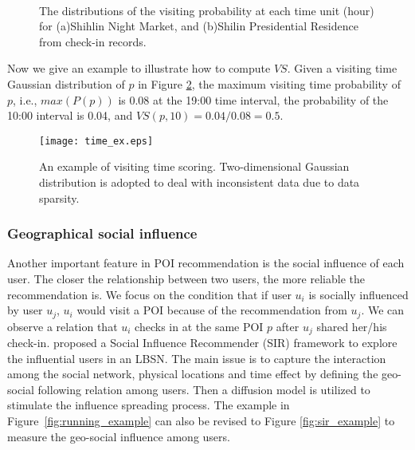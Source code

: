 \begin{figure}[t]
\centerline{
\mbox{
}}
\caption{The distributions of the visiting probability at each time unit (hour) for (a)Shihlin Night Market, and (b)Shilin Presidential Residence from check-in records.}
\label{fig:time_distribute}
\end{figure}

Now we give an example to illustrate how to compute $VS$. Given a visiting time Gaussian distribution of $p$ in Figure \ref{fig:time_ex}, the maximum visiting time probability of $p$, i.e., $max(P(p))$ is 0.08 at the 19:00 time interval, the probability of the 10:00 interval is 0.04, and $VS(p,10)=0.04/0.08=0.5$.

\begin{figure}[t]
\centering
\texttt{[image: time\_ex.eps]}
\caption{An example of visiting time scoring. Two-dimensional Gaussian distribution is adopted to deal with inconsistent data due to data sparsity.}
\label{fig:time_ex} %
\end{figure}

\subsubsection{Geographical social influence}
Another important feature in POI recommendation is the social influence of each user. The closer the relationship between two users, the more reliable the recommendation is. We focus on the condition that if user $u_i$ is socially influenced by user $u_j$, $u_i$ would visit a POI because of the recommendation from $u_j$. We can observe a relation that $u_i$ checks in at the same POI $p$ after $u_j$ shared her/his check-in. \cite{ytwen2014} proposed a Social Influence Recommender (SIR) framework to explore the influential users in an LBSN. The main issue is to capture the interaction among the social network, physical locations and time effect by defining the geo-social following relation among users. Then a diffusion model is utilized to stimulate the influence spreading process. The example in Figure~\ref{fig:running_example} can also be revised to Figure \ref{fig:sir_example} to measure the geo-social influence among users.

